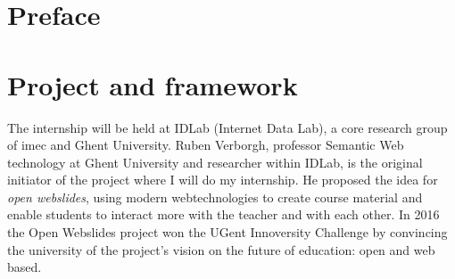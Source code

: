 \documentclass[10pt,a4paper]{article}
\makeatletter
\newcommand{\coursename}{Internship Applied Computer Science}
\newcommand{\courseyear}{Academy year 2017-2018}
\newcommand{\documenttitle}{Internship report}
\newcommand{\authoronename}{Jasper D'haene}
\newcommand{\authoroneemail}{jasper.dhaene@gmail.com}
\newcommand{\authortwoname}{Florian Dejonckheere}
\newcommand{\authortwoemail}{florian@dejonckhee.re}
\newcommand{\hogentlogo}{hogent-logo.png}
\newcommand{\hogentheader}{header.png}
\newcommand{\florian}[1]{\ifthenelse{\isundefined{\isflorian}}{}{#1}}
\newcommand{\jasper}[1]{\ifthenelse{\isundefined{\isjasper}}{}{#1}}
\newcommand{\isflorian}{}
\makeatother
\begin{document}
  


  \nopagecolor
  \renewcommand{\footrulewidth}{0.4pt}
  \headheight 45pt
  \ULCornerWallPaper{1}{\hogentheader}
  \fancyfoot[C]{\thepage}

  \tableofcontents

  \cleardoublepage{}

  \section{Preface}

  \section{Project and framework}
    The internship will be held at IDLab (Internet Data Lab), a core research group of imec and Ghent University. Ruben Verborgh, professor Semantic Web technology at Ghent University and researcher within IDLab, is the original initiator of the project where I will do my internship. He proposed the idea for \textit{open webslides}, using modern webtechnologies to create course material and enable students to interact more with the teacher and with each other. In 2016 the Open Webslides project won the UGent Innoversity Challenge by convincing the university of the project's vision on the future of education: open and web based.
\end{document}
